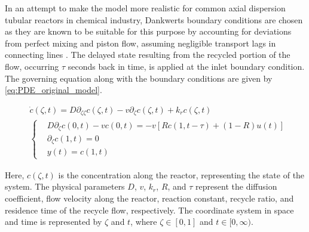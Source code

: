 In an attempt to make the model more realistic for common axial dispersion tubular reactors in chemical industry, Dankwerts boundary conditions are chosen as they are known to be suitable for this purpose by accounting for deviations from perfect mixing and piston flow, assuming negligible transport lags in connecting lines \cite{danckwerts1993continuous}. The delayed state resulting from the recycled portion of the flow, occurring $\tau$ seconds back in time, is applied at the inlet boundary condition. The governing equation along with the boundary conditions are given by \eqref{eq:PDE_original_model}.

\begin{equation} \label{eq:PDE_original_model}
    \begin{aligned}
        &\dot{c}(\zeta, t) = D \partial_{\zeta \zeta} c(\zeta, t) - v \partial_\zeta c(\zeta, t) + k_r c(\zeta, t) \\
        &\begin{cases}
            &D \partial_\zeta c(0, t) - v c(0, t) = -v \left[ R c(1, t-\tau) + (1-R) u(t) \right] \\
            &\partial_\zeta c(1, t) = 0 \\
            &y(t) = c(1, t)
        \end{cases}
    \end{aligned}
\end{equation}

Here, $c(\zeta, t)$ is the concentration along the reactor, representing the state of the system. The physical parameters $D$, $v$, $k_r$, $R$, and $\tau$ represent the diffusion coefficient, flow velocity along the reactor, reaction constant, recycle ratio, and residence time of the recycle flow, respectively. The coordinate system in space and time is represented by $\zeta$ and $t$, where $\zeta \in [0, 1]$ and $t \in [0, \infty)$.

